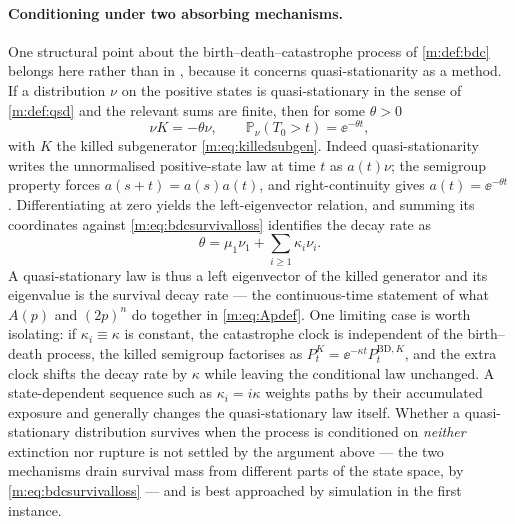 \paragraph{Conditioning under two absorbing mechanisms.}
One structural point about the birth--death--catastrophe process of
\cref{m:def:bdc} belongs here rather than in \ChA, because it concerns
quasi-stationarity as a method. If a distribution $\nu$ on the positive states is
quasi-stationary in the sense of \cref{m:def:qsd} and the relevant sums are finite,
then for some $\theta>0$
\begin{equation}
\label{m:eq:bdcqsdeigen}
\nu K = -\theta\nu,
\qquad
\mathbb{P}_\nu\!\left(T_0>t\right) = \ee^{-\theta t},
\end{equation}
with $K$ the killed subgenerator \cref{m:eq:killedsubgen}. Indeed
quasi-stationarity writes the unnormalised positive-state law at time $t$ as
$a(t)\nu$; the semigroup property forces $a(s+t)=a(s)a(t)$, and right-continuity
gives $a(t)=\ee^{-\theta t}$. Differentiating at zero yields the left-eigenvector
relation, and summing its coordinates against \cref{m:eq:bdcsurvivalloss}
identifies the decay rate as
\begin{equation}
\label{m:eq:bdcdecayrate}
\theta = \mu_1\nu_1 + \sum_{i\ge1}\kappa_i\nu_i .
\end{equation}
A quasi-stationary law is thus a left eigenvector of the killed generator and its
eigenvalue is the survival decay rate --- the continuous-time statement of what
$A(p)$ and $(2p)^n$ do together in \cref{m:eq:Apdef}. One limiting case is worth
isolating: if $\kappa_i\equiv\kappa$ is constant, the catastrophe clock is
independent of the birth--death process, the killed semigroup factorises as
$P^K_t = \ee^{-\kappa t}P^{\mathrm{BD},K}_t$, and the extra clock shifts the decay
rate by $\kappa$ while leaving the conditional law unchanged. A state-dependent
sequence such as $\kappa_i=i\kappa$ weights paths by their accumulated exposure and
generally changes the quasi-stationary law itself. Whether a quasi-stationary
distribution survives when the process is conditioned on \emph{neither} extinction
nor rupture is not settled by the argument above --- the two mechanisms drain
survival mass from different parts of the state space, by
\cref{m:eq:bdcsurvivalloss} --- and is best approached by simulation in the first
instance.
